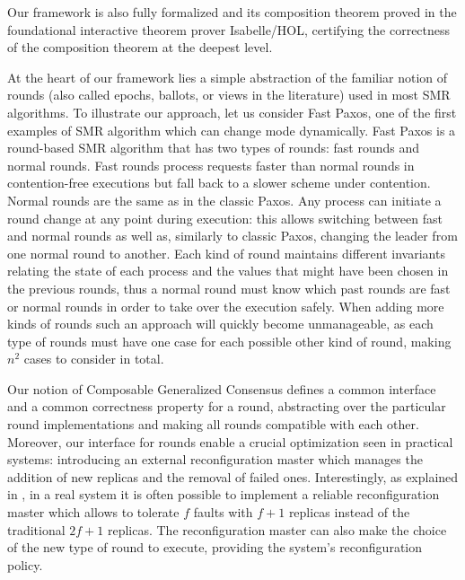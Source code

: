 Our framework is also fully formalized and its composition theorem proved in the foundational interactive theorem prover Isabelle/HOL, certifying the correctness of the composition theorem at the deepest level.

At the heart of our framework lies a simple abstraction of the familiar notion of rounds (also called epochs, ballots, or views in the literature) used in most SMR algorithms. To illustrate our approach, let us consider Fast Paxos, one of the first examples of SMR algorithm which can change mode dynamically.
Fast Paxos is a round-based SMR algorithm that has two types of rounds: fast rounds and normal rounds. Fast rounds process requests faster than normal rounds in contention-free executions but fall back to a slower scheme under contention. Normal rounds are the same as in the classic Paxos. Any process can initiate a round change at any point during execution: this allows switching between fast and normal rounds as well as, similarly to classic Paxos, changing the leader from one normal round to
another. Each kind of round maintains different invariants relating the state of each process and the values that might have been chosen in the previous rounds, thus a normal round must know which past rounds are fast or normal rounds in order to take over the execution safely. When adding more kinds of rounds such an approach will quickly become unmanageable, as each type of rounds must have one case for each possible other kind of round, making $n^2$ cases to consider in total.

Our notion of Composable Generalized Consensus defines a common interface and a common correctness property for a round, abstracting over the particular round implementations and making all rounds compatible with each other. 
Moreover, our interface for rounds enable a crucial optimization seen in practical systems: introducing an external reconfiguration master which manages the addition of new replicas and the removal of failed ones. Interestingly, as explained in \cite{LamportMalkhiZhou09VerticalPaxosPrimarybackupReplication}, in a real system it is often possible to implement a reliable reconfiguration master which allows to tolerate $f$ faults with $f+1$ replicas instead of the traditional $2f+1$ replicas.
The reconfiguration master can also make the choice of the new type of round to execute, providing the system's reconfiguration policy. 
